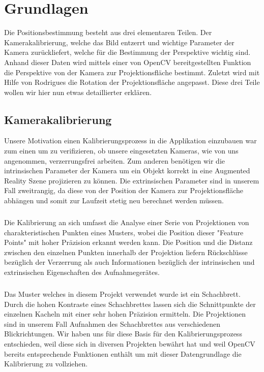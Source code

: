 \chapter{Grundlagen}

Die Positionsbestimmung besteht aus drei elementaren Teilen. Der Kamerakalibrierung, welche das Bild entzerrt und wichtige Parameter der Kamera zurückliefert, welche für die Bestimmung der Perspektive wichtig sind. Anhand dieser Daten wird mittels einer von OpenCV bereitgestellten Funktion die Perspektive von der Kamera zur Projektionsfläche bestimmt. Zuletzt wird mit Hilfe von Rodrigues die Rotation der Projektionsfläche angepasst. Diese drei Teile wollen wir hier nun etwas detaillierter erklären.

\section{Kamerakalibrierung}
Unsere Motivation einen Kalibrierungsprozess in die Applikation einzubauen war zum einen um zu verifizieren, ob unsere eingesetzten Kameras, wie von uns angenommen, verzerrungsfrei arbeiten. Zum anderen benötigen wir die intrinsischen Parameter der Kamera um ein Objekt korrekt in eine Augmented Reality Szene projizieren zu können. Die extrinsischen Parameter sind in unserem Fall zweitrangig, da diese von der Position der Kamera zur Projektionsfläche abhängen und somit zur Laufzeit stetig neu berechnet werden müssen.
\paragraph{}
Die Kalibrierung an sich umfasst die Analyse einer Serie von Projektionen von charakteristischen Punkten eines Musters, wobei die Position dieser "Feature Points" mit hoher Präzision erkannt werden kann. Die Position und die Distanz zwischen den einzelnen Punkten innerhalb der Projektion liefern Rückschlüsse bezüglich der Verzerrung als auch Informationen bezüglich der intrinsischen und extrinsischen Eigenschaften des Aufnahmegerätes. 
\paragraph{}
Das Muster welches in diesem Projekt verwendet wurde ist ein Schachbrett. Durch die hohen Kontraste eines Schachbrettes lassen sich die Schnittpunkte der einzelnen Kacheln mit einer sehr hohen Präzision ermitteln. Die Projektionen sind in unserem Fall Aufnahmen des Schachbrettes aus verschiedenen Blickrichtungen. Wir haben uns für diese Basis für den Kalibrierungsprozess entschieden, weil diese sich in diversen Projekten bewährt hat und weil OpenCV bereits entsprechende Funktionen enthält um mit dieser Datengrundlage die Kalibrierung zu vollziehen. 

